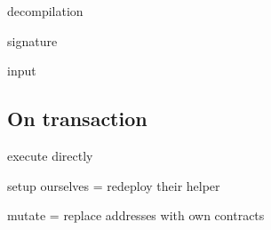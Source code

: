 decompilation

signature

input



\subsection{On transaction}

execute directly

setup ourselves = redeploy their helper

mutate = replace addresses with own contracts

